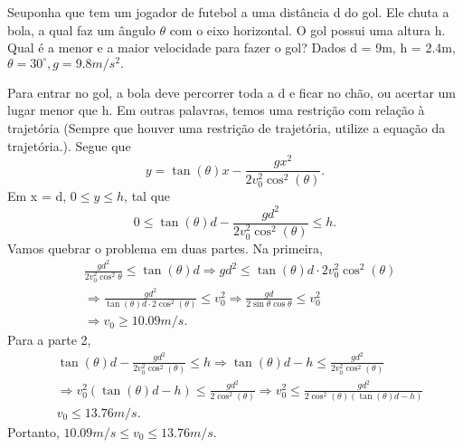 \documentclass[physics_notes.tex]{subfiles}
\begin{document}
\begin{example}
	Seuponha que tem um jogador de futebol a uma distância d do gol. Ele chuta a bola, a qual faz um ângulo $\theta $ com o
	eixo horizontal. O gol possui uma altura h. Qual é a menor e a maior velocidade para fazer o gol? Dados d = 9m, h = 2.4m, $\theta =30^{\circ}, g=9.8m/s^{2}.$

	Para entrar no gol, a bola deve percorrer toda a d e ficar no chão, ou acertar um lugar menor que h. Em outras palavras,
	temos uma restrição com relação à trajetória (Sempre que houver uma restrição de trajetória, utilize a equação da trajetória.).
	Segue que
	$$
		y = \tan{(\theta)}x - \frac{gx^{2}}{2v_{0}^{2}\cos^{2}{(\theta )}}.
	$$
	Em x = d, $0\leq y\leq h$, tal que
	$$
		0\leq \tan{(\theta)}d - \frac{gd^{2}}{2v_{0}^{2}\cos^{2}{(\theta )}}\leq h.
	$$
	Vamos quebrar o problema em duas partes. Na primeira,
	\begin{align*}
		 & \frac{gd^{2}}{2v_{0}^{2}\cos^{2}{\theta }}\leq \tan{(\theta )}d \Rightarrow gd^{2}\leq \tan{(\theta )}d \cdot 2v_{0}^{2}\cos^{2}{(\theta)}             \\
		 & \Rightarrow \frac{gd^{2}}{\tan{(\theta )}d \cdot 2\cos^{2}{(\theta )}}\leq v_{0}^{2} \Rightarrow  \frac{gd}{2\sin{\theta }\cos{\theta }}\leq v_{0}^{2} \\
		 & \Rightarrow v_{0}\geq 10.09m/s.
	\end{align*}
	Para a parte 2,
	\begin{align*}
		 & \tan{(\theta )}d - \frac{gd^{2}}{2v_{0}^{2}\cos^{2}{(\theta )}}\leq  h \Rightarrow \tan{(\theta )}d - h\leq \frac{gd^{2}}{2v_{0}^{2}\cos^{2}{(\theta )}}               \\
		 & \Rightarrow v_{0}^{2}(\tan{(\theta )}d - h)\leq \frac{gd^{2}}{2\cos^{2}{(\theta )}} \Rightarrow  v_{0}^{2}\leq \frac{gd^{2}}{2\cos^{2}{(\theta )}(\tan{(\theta )}d-h)} \\
		 & v_{0}\leq 13.76m/s.
	\end{align*}
	Portanto, $10.09m/s\leq v_{0}\leq 13.76m/s.$
\end{example}
\end{document}
